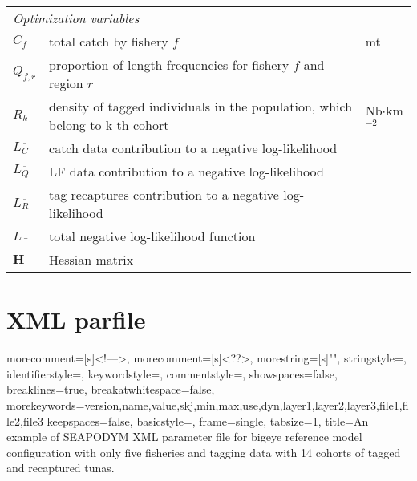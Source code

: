 \begin{longtable}{lp{11cm}l}
\cline{1-3}
\multicolumn{3}{l}{\textit {Optimization variables}}\\
\cline{1-3}
 $C_{f}$ 	& total catch by fishery $f$								  			& mt\\
 $Q_{f,r}$ 	& proportion of length frequencies for fishery $f$ and region $r$	& \\
 $R_{k}$ 	& density of tagged individuals in the population, which belong to k-th cohort& Nb$\cdot$km$^{-2}$\\
 $L_{\scriptscriptstyle  C}^{\bar{\text{ }}}$ & catch data contribution to a negative log-likelihood					  					&\\
 $L_{\scriptscriptstyle  Q}^{\bar{\text{ }}}$ & LF data contribution to a negative log-likelihood					  					&\\
 $L_{\scriptscriptstyle  R}^{\bar{\text{ }}}$ & tag recaptures contribution to a negative log-likelihood					  					&\\
 $L\bar{\text{ }}$ & total negative log-likelihood function					  					&\\
 $\mathbf{H}$ & Hessian matrix					  					&\\
\hline
\end{longtable}

\newpage

\section{XML parfile}
\label{sec:appendix-parfile}



{
  morecomment=[s]{<!--}{-->},
  morecomment=[s]{<?}{?>},
  morestring=[s]{"}{"},
  stringstyle=\color{darkmauve},
  identifierstyle=\color{darkblue},
  keywordstyle=\color{darkred},
  commentstyle=\color{darkgreen},
  showspaces=false,
  breaklines=true,  %
  breakatwhitespace=false,
  morekeywords={version,name,value,skj,min,max,use,dyn,layer1,layer2,layer3,file1,file2,file3}%
  keepspaces=false,
  basicstyle=\footnotesize, 
  frame=single, 
  tabsize=1,   
  title={An example of SEAPODYM XML parameter file for bigeye reference model configuration with only five fisheries and tagging data with 14 cohorts of tagged and recaptured tunas.\\}  %
}


\lstset{language=MYXML}



